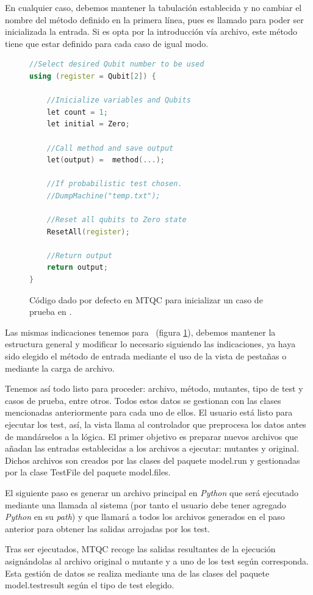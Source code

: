 En cualquier caso, debemos mantener la tabulación establecida y no cambiar el nombre del método definido en la primera línea, pues es llamado para poder ser inicializada la entrada. Si es opta por la introducción vía archivo, este método tiene que estar definido para cada caso de igual modo.

\begin{figure}[htb]
\begin{lstlisting}[language=c++]
//Select desired Qubit number to be used
using (register = Qubit[2]) {

	//Inicialize variables and Qubits
	let count = 1;
	let initial = Zero;

	//Call method and save output
	let(output) =  method(...);

	//If probabilistic test chosen.
	//DumpMachine("temp.txt");

	//Reset all qubits to Zero state
	ResetAll(register);

	//Return output
	return output;
}
\end{lstlisting}
\caption{Código dado por defecto en MTQC para inicializar un caso de prueba en \qsh.}
\label{fig:code4}
\end{figure}

Las mismas indicaciones tenemos para \qsh\ (figura \ref{fig:code4}), debemos mantener la estructura general y modificar lo necesario siguiendo las indicaciones, ya haya sido elegido el método de entrada mediante el uso de la vista de pestañas o mediante la carga de archivo.

Tenemos así todo listo para proceder: archivo, método, mutantes, tipo de test y casos de prueba, entre otros. Todos estos datos se gestionan con las clases mencionadas anteriormente para cada uno de ellos. El usuario está listo para ejecutar los test, así, la vista llama al controlador que preprocesa los datos antes de mandárselos a la lógica. El primer objetivo es preparar nuevos archivos que añadan las entradas establecidas a los archivos a ejecutar: mutantes y original. Dichos archivos son creados por las clases del paquete model.run y gestionadas por la clase TestFile del paquete model.files.

El siguiente paso es generar un archivo principal en \textit{Python} que será ejecutado mediante una llamada al sistema (por tanto el usuario debe tener agregado \textit{Python} en su \textit{path}) y que llamará a todos los archivos generados en el paso anterior para obtener las salidas arrojadas por los test.

Tras ser ejecutados, MTQC recoge las salidas resultantes de la ejecución asignándolas al archivo original o mutante y a uno de los test según corresponda. Esta gestión de datos se realiza mediante una de las clases del paquete model.testresult según el tipo de test elegido.

